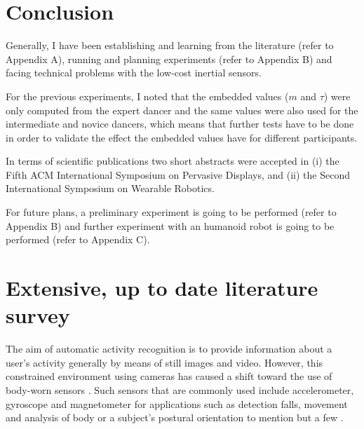 \documentclass[11pt,journal,onecolumn,compsoc]{IEEEtran}
\begin{document}
\section{Conclusion}


Generally, I have been establishing and learning 
from the literature (refer to Appendix A), running and planning experiments (refer to Appendix B)
and facing technical problems with the low-cost inertial sensors. 

For the previous experiments, I noted that the embedded values ($m$ and $\tau$)  were 
only computed from the expert dancer and 
the same values were also used for the intermediate and novice dancers,
which means that further tests have to be done in order to validate the 
effect the embedded values have for different participants.

In terms of scientific publications two short abstracts were accepted in
(i) the Fifth ACM International Symposium on Pervasive Displays, and 
(ii) the Second International Symposium on Wearable Robotics.

For future plans, a preliminary experiment is going to be performed (refer to Appendix B)
and further experiment with an humanoid robot is going to be performed (refer to Appendix C).


\appendices

\section{Extensive, up to date literature survey}


The aim of automatic activity recognition is to provide information about a user's activity
generally by means of still images and video. 
However, this constrained environment using cameras has caused a shift toward the use of body-worn sensors \cite{bulling2014}.
Such sensors that are commonly used include accelerometer, gyroscope and magnetometer
for applications such as detection falls, movement and analysis of body 
or a subject's postural orientation to mention but a few \cite{Mukhopadhyay2014}.
\end{document}
